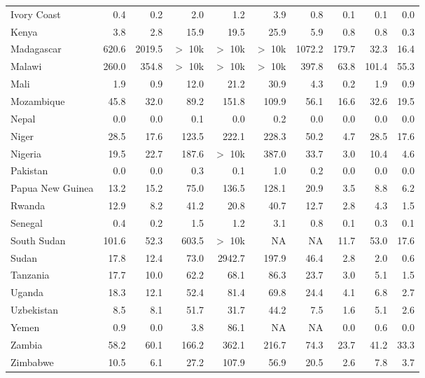 \begin{table}[b]
{\begin{tabular}[t]{lrrrrrrrrr}
Ivory Coast & 0.4 & 0.2 & 2.0 & 1.2 & 3.9 & 0.8 & 0.1 & 0.1 & 0.0\\
Kenya & 3.8 & 2.8 & 15.9 & 19.5 & 25.9 & 5.9 & 0.8 & 0.8 & 0.3\\
Madagascar & 620.6 & 2019.5 & $>$ 10k & $>$ 10k & $>$ 10k & 1072.2 & 179.7 & 32.3 & 16.4\\
Malawi & 260.0 & 354.8 & $>$ 10k & $>$ 10k & $>$ 10k & 397.8 & 63.8 & 101.4 & 55.3\\
Mali & 1.9 & 0.9 & 12.0 & 21.2 & 30.9 & 4.3 & 0.2 & 1.9 & 0.9\\
Mozambique & 45.8 & 32.0 & 89.2 & 151.8 & 109.9 & 56.1 & 16.6 & 32.6 & 19.5\\
Nepal & 0.0 & 0.0 & 0.1 & 0.0 & 0.2 & 0.0 & 0.0 & 0.0 & 0.0\\
Niger & 28.5 & 17.6 & 123.5 & 222.1 & 228.3 & 50.2 & 4.7 & 28.5 & 17.6\\
Nigeria & 19.5 & 22.7 & 187.6 & $>$ 10k & 387.0 & 33.7 & 3.0 & 10.4 & 4.6\\
Pakistan & 0.0 & 0.0 & 0.3 & 0.1 & 1.0 & 0.2 & 0.0 & 0.0 & 0.0\\
Papua New Guinea & 13.2 & 15.2 & 75.0 & 136.5 & 128.1 & 20.9 & 3.5 & 8.8 & 6.2\\
Rwanda & 12.9 & 8.2 & 41.2 & 20.8 & 40.7 & 12.7 & 2.8 & 4.3 & 1.5\\
Senegal & 0.4 & 0.2 & 1.5 & 1.2 & 3.1 & 0.8 & 0.1 & 0.3 & 0.1\\
South Sudan & 101.6 & 52.3 & 603.5 & $>$ 10k & NA & NA & 11.7 & 53.0 & 17.6\\
Sudan & 17.8 & 12.4 & 73.0 & 2942.7 & 197.9 & 46.4 & 2.8 & 2.0 & 0.6\\
Tanzania & 17.7 & 10.0 & 62.2 & 68.1 & 86.3 & 23.7 & 3.0 & 5.1 & 1.5\\
Uganda & 18.3 & 12.1 & 52.4 & 81.4 & 69.8 & 24.4 & 4.1 & 6.8 & 2.7\\
Uzbekistan & 8.5 & 8.1 & 51.7 & 31.7 & 44.2 & 7.5 & 1.6 & 5.1 & 2.6\\
Yemen & 0.9 & 0.0 & 3.8 & 86.1 & NA & NA & 0.0 & 0.6 & 0.0\\
Zambia & 58.2 & 60.1 & 166.2 & 362.1 & 216.7 & 74.3 & 23.7 & 41.2 & 33.3\\
Zimbabwe & 10.5 & 6.1 & 27.2 & 107.9 & 56.9 & 20.5 & 2.6 & 7.8 & 3.7\\
\bottomrule
\end{tabular}}
\end{table}